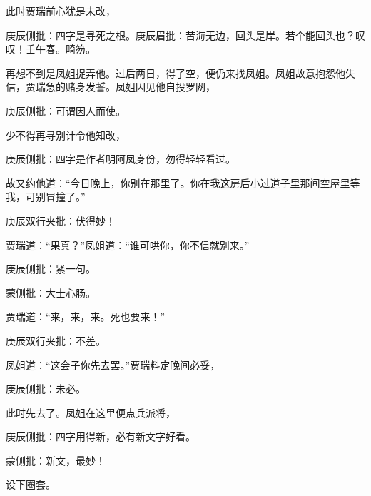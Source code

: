 \begin{parag}


    此时贾瑞前心犹是未改，\begin{note}庚辰侧批：四字是寻死之根。庚辰眉批：苦海无边，回头是岸。若个能回头也？叹叹！壬午春。畸笏。\end{note}再想不到是凤姐捉弄他。过后两日，得了空，便仍来找凤姐。凤姐故意抱怨他失信，贾瑞急的赌身发誓。凤姐因见他自投罗网，\begin{note}庚辰侧批：可谓因人而使。\end{note}少不得再寻别计令他知改，\begin{note}庚辰侧批：四字是作者明阿凤身份，勿得轻轻看过。\end{note}故又约他道：“今日晚上，你别在那里了。你在我这房后小过道子里那间空屋里等我，可别冒撞了。”\begin{note}庚辰双行夹批：伏得妙！\end{note}贾瑞道：“果真？”凤姐道：“谁可哄你，你不信就别来。”\begin{note}庚辰侧批：紧一句。\end{note}\begin{note}蒙侧批：大士心肠。\end{note}贾瑞道：“来，来，来。死也要来！”\begin{note}庚辰双行夹批：不差。\end{note}凤姐道：“这会子你先去罢。”贾瑞料定晚间必妥，\begin{note}庚辰侧批：未必。\end{note}此时先去了。凤姐在这里便点兵派将，\begin{note}庚辰侧批：四字用得新，必有新文字好看。\end{note}\begin{note}蒙侧批：新文，最妙！\end{note}设下圈套。
\end{parag}


